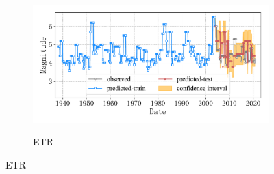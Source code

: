 \begin{figure}[!htbp]
\begin{subfigure}[b]{0.45\textwidth}
    \vspace{-1cm}
    \label{fig:seism_knn_minyear_1932_maxyear_2021_spanlat_2_spanlon_4_timewindow_72_nextmonth_12_minmag_3.0_block_2}
  \end{subfigure}
  ~
  \begin{subfigure}[b]{0.45\textwidth}
    \caption{ETR}
    \vspace{-0.2cm}
    \includegraphics[width=\textwidth]{Img/chap5_seism/block2/seism_etr_minyear_1932_maxyear_2021_spanlat_2_spanlon_4_timewindow_72_nextmonth_12_minmag_3.0_block_2.pdf}
    \vspace{-1cm}
    \label{fig:seism_etr_minyear_1932_maxyear_2021_spanlat_2_spanlon_4_timewindow_72_nextmonth_12_minmag_3.0_block_2}
  \end{subfigure}
  \label{fig:seism_minyear_1932_maxyear_2021_spanlat_2_spanlon_4_timewindow_72_nextmonth_12_minmag_3.0_block_2}
\end{figure}

